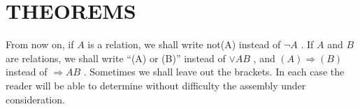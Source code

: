 \section{THEOREMS}

From now on, if \(A\) is a relation, we shall write not(A) instead of \(\neg A\) . If \(A\) and \(B\) are relations, we shall write ``(A) or (B)'' instead of \(\vee AB\) , and \((A) \Longrightarrow (B)\) instead of \(\Longrightarrow AB\) . Sometimes we shall leave out the brackets. In each case the reader will be able to determine without difficulty the assembly under consideration.


